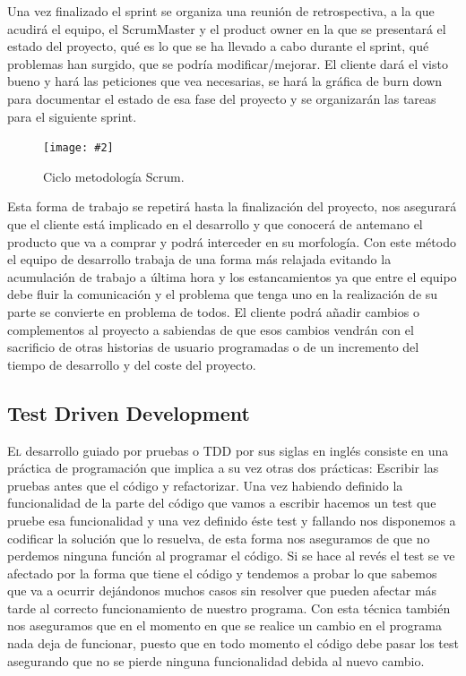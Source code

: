 \documentclass[12pt,a4paper,spanish]{book} %
\newcommand{\imgCentrada}[3]{
\begin{figure}[H]
\begin{center}
\texttt{[image: \#2]}
\caption{#3}
\label{#1}
\end{center}
\end{figure}
}
\begin{document}
Una vez finalizado el sprint se organiza una reunión de retrospectiva, a la que acudirá el equipo, el ScrumMaster y el product owner en la que se presentará el estado del proyecto, qué es lo que se ha llevado a cabo durante el sprint, qué problemas han surgido, que se podría modificar/mejorar. El cliente dará el visto bueno y hará las peticiones que vea necesarias, se hará la gráfica de burn down para documentar el estado de esa fase del proyecto y se organizarán las tareas para el siguiente sprint.

\imgCentrada{fig.2.2}{img/scrum.eps}{Ciclo metodología Scrum.}

Esta forma de trabajo se repetirá hasta la finalización del proyecto, nos asegurará que el cliente está implicado en el desarrollo y que conocerá de antemano el producto que va a comprar y podrá interceder en su morfología. Con este método el equipo de desarrollo trabaja de una forma más relajada evitando la acumulación de trabajo a última hora y los estancamientos ya que entre el equipo debe fluir la comunicación y el problema que tenga uno en la realización de su parte se convierte en problema de todos. El cliente podrá añadir cambios o complementos al proyecto a sabiendas de que esos cambios vendrán con el sacrificio de otras historias de usuario programadas o de un incremento del tiempo de desarrollo y del coste del proyecto.

\subsection{Test Driven Development}

\lettrine{E}{l} desarrollo guiado por pruebas o TDD por sus siglas en inglés consiste en una práctica de programación que implica a su vez otras dos prácticas: Escribir las pruebas antes que el código y refactorizar. Una vez habiendo definido la funcionalidad de la parte del código que vamos a escribir hacemos un test que pruebe esa funcionalidad y una vez definido éste test y fallando nos disponemos a codificar la solución que lo resuelva, de esta forma nos aseguramos de que no perdemos ninguna función al programar el código. Si se hace al revés el test se ve afectado por la forma que tiene el código y tendemos a probar lo que sabemos que va a ocurrir dejándonos muchos casos sin resolver que pueden afectar más tarde al correcto funcionamiento de nuestro programa. Con esta técnica también nos aseguramos que en el momento en que se realice un cambio en el programa nada deja de funcionar, puesto que en todo momento el código debe pasar los test asegurando que no se pierde ninguna funcionalidad debida al nuevo cambio.
\end{document}
